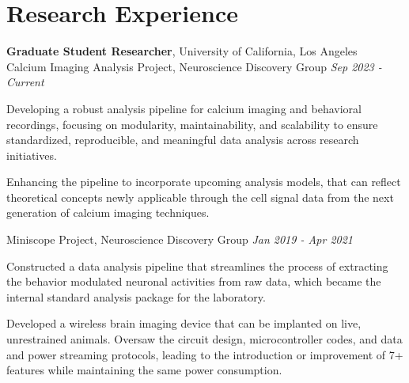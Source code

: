 \section{\mysidestyle Research Experience}
\textbf{Graduate Student Researcher}, University of California, Los Angeles\\
Calcium Imaging Analysis Project, Neuroscience Discovery Group \hfill \textsl{Sep 2023 - Current}

\begin{list2}
    \item {Developing a robust analysis pipeline for calcium imaging and behavioral recordings, focusing on modularity, maintainability, and scalability to ensure standardized, reproducible, and meaningful data analysis across research initiatives.}
    \item {Enhancing the pipeline to incorporate upcoming analysis models, that can reflect theoretical concepts newly applicable through the cell signal data from the next generation of calcium imaging techniques.}
\end{list2}

Miniscope Project, Neuroscience Discovery Group \hfill \textsl{Jan 2019 - Apr 2021}

\begin{list2}
    \item {Constructed a data analysis pipeline that streamlines the process of extracting the behavior modulated neuronal activities from raw data, which became the internal standard analysis package for the laboratory.}
    \item {Developed a wireless brain imaging device that can be implanted on live, unrestrained animals. Oversaw the circuit design, microcontroller codes, and data and power streaming protocols, leading to the introduction or improvement of 7+ features while maintaining the same power consumption.}
\end{list2}



